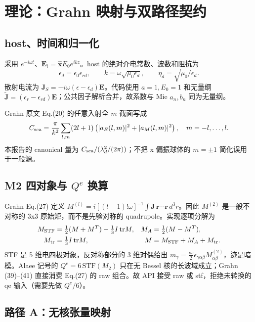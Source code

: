 \section{理论：Grahn 映射与双路径契约}

\subsection{host、时间和归一化}

采用 $e^{-i\omega t}$、$\mathbf E_i=\hat{\mathbf x}E_0e^{ikz}$。host 的绝对介电常数、波数和阻抗为
\begin{equation}
 \epsilon_d=\epsilon_0\epsilon_{rd},\qquad k=\omega\sqrt{\mu_0\epsilon_d},\qquad \eta_d=\sqrt{\mu_0/\epsilon_d}.
\end{equation}
散射电流为 $\mathbf J_S=-i\omega(\epsilon-\epsilon_d)\mathbf E$。代码使用 $a=1,E_0=1$ 和无量纲 $\widetilde{\mathbf J}=(\epsilon_r-\epsilon_{rd})\mathbf E$；公共因子解析合并，故系数与 Mie $a_n,b_n$ 同为无量纲。

Grahn 原文 Eq.(20) 的任意入射全 $m$ 截面写成
\begin{equation}
 C_{\rm sca}=\frac{\pi}{k^2}\sum_{l,m}(2l+1)\left(|a_E(l,m)|^2+|a_M(l,m)|^2\right),\quad m=-l,\ldots,l .
\end{equation}
本报告的 canonical 量为 $C_{\rm sca}/(\lambda_d^2/(2\pi))$；不把 x 偏振球体的 $m=\pm1$ 简化误用于一般源。

\subsection{M2 四对象与 $Q^e$ 换算}

Grahn Eq.(27) 定义 $M^{(l)}=i[(l-1)!\omega]^{-1}\int \mathbf J\,\mathbf r\cdots\mathbf r\,d^3r$。因此 $M^{(2)}$ 是一般不对称的 3x3 原始矩，而不是先验对称的 quadrupole。实现逐项分解为
\begin{align}
 M_{\rm STF}&=\tfrac12(M+M^T)-\tfrac13I\,\mathrm{tr}M, & M_A&=\tfrac12(M-M^T),\\
 M_{\rm tr}&=\tfrac13I\,\mathrm{tr}M, & M&=M_{\rm STF}+M_A+M_{\rm tr}.
\end{align}
STF 是 5 维电四极对象，反对称部分的 3 维对偶给出 $m_\gamma=\frac{i\omega}{2}\epsilon_{\gamma\alpha\beta}M^{(2)}_{\alpha\beta}$，迹是暗模。Alaee 记号的 $Q^e=6\,\mathrm{STF}(M_2)$ 只在无 Bessel 核的长波域成立；Grahn (39)--(41) 直接消费 Eq.(27) 的 raw 组合。故 API 接受 raw 或 stf，拒绝未转换的 qe 输入（需要先做 $Q^e/6$）。

\subsection{路径 A：无核张量映射}

